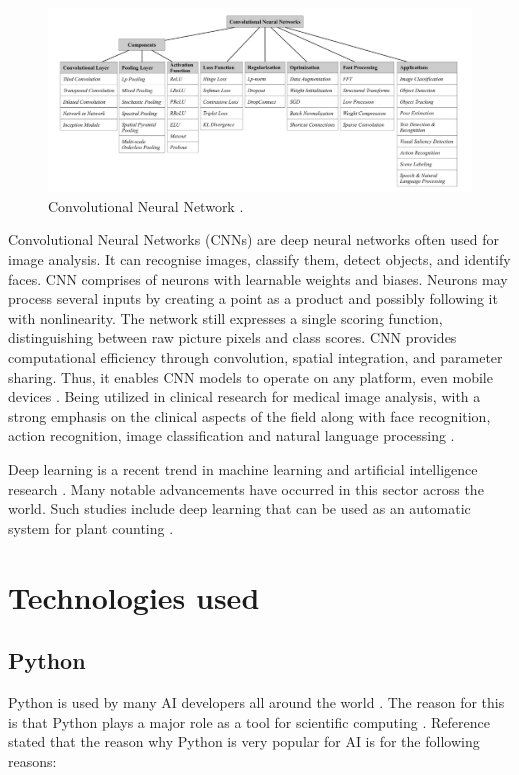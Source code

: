 \documentclass[conference]{IEEEtran}
\begin{document}
\begin{figure}[h]
    \centering
    \includegraphics[width=\linewidth]{CNN_Components.png}
    \caption{Convolutional Neural Network \cite{b6}.}
    \label{figCNN}
\end{figure}

Convolutional Neural Networks (CNNs) are deep neural networks often used for image analysis.  It can recognise images, classify them, detect objects, and identify faces. CNN comprises of neurons with learnable weights and biases. Neurons may process several inputs by creating a point as a product and possibly following it with nonlinearity. The network still expresses a single scoring function, distinguishing between raw picture pixels and class scores.  CNN provides computational efficiency through convolution, spatial integration, and parameter sharing. Thus, it enables CNN models to operate on any platform, even mobile devices \cite{b26}. Being utilized in clinical research for medical image analysis, with a strong emphasis on the clinical aspects of the field \cite{b25} along with face recognition, action recognition, image classification and natural language processing \cite{b24}.

Deep learning is a recent trend in machine learning and artificial intelligence research \cite{b27}. Many notable advancements have occurred in this sector across the world. Such studies include deep learning that can be used as an automatic system for plant counting \cite{b28}\cite{b29}.

\section{Technologies used}

\subsection{Python}

Python is used by many AI developers all around the world \cite{b8}. The reason for this is that Python plays a major role as a tool for scientific computing \cite{b8}. Reference \cite{b8} stated that the reason why Python is very popular for AI is for the following reasons:
\end{document}
